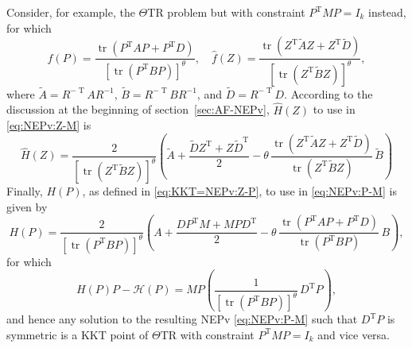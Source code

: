 \documentclass[11pt]{article}
\def\scrH{\mathscr{H}}
\def\wtd{\widetilde}
\def\what{\widehat}
\newcommand\STM[2]{{\rm St}(#1,#2)}
\DeclareMathOperator{\tr}{tr}
\DeclareMathOperator{\T}{T}
\theoremstyle{definition}
\numberwithin{equation}{section}
\begin{document}
Consider, for example, the $\Theta$TR problem but with  constraint $P^{\T}MP=I_k$ instead, for which
$$
f(P)=\frac {\tr(P^{\T}AP+P^{\T}D)}{[\tr(P^{\T}BP)]^{\theta}}, \quad
\hat f(Z)=\frac {\tr(Z^{\T}\wtd AZ+Z^{\T}\wtd D)}{[\tr(Z^{\T}\wtd BZ)]^{\theta}},
$$
where $\wtd A=R^{-\T}AR^{-1}$, $\wtd B=R^{-\T}BR^{-1}$, and $\wtd D=R^{-\T}D$. According to the discussion
at the beginning of section~\ref{sec:AF-NEPv}, $\what H(Z)$ to use in \eqref{eq:NEPv:Z-M} is
$$
\what H(Z)=\frac 2{[\tr(Z^{\T}\wtd BZ)]^{\theta}}
     \left(\wtd A+\frac {\wtd DZ^{\T}+Z\wtd D^{\T}}2
           -\theta\,\frac {\tr(Z^{\T}\wtd AZ+Z^{\T}\wtd D)}{\tr(Z^{\T}\wtd BZ)}\,\wtd B\right)
$$
Finally, $H(P)$, as defined in \eqref{eq:KKT=NEPv:Z-P},  to use in \eqref{eq:NEPv:P-M} is given by
$$
H(P)=\frac 2{[\tr(P^{\T}BP)]^{\theta}}
     \left(A+\frac {DP^{\T}M+MPD^{\T}}2-\theta\,\frac {\tr(P^{\T}AP+P^{\T}D)}{\tr(P^{\T}BP)}\,B\right),
$$
for which
$$
H(P)P-\scrH(P)=MP\left(\frac 1{[\tr(P^{\T}BP)]^{\theta}}\, {D^{\T}P}\right),
$$
and hence any solution to the resulting NEPv \eqref{eq:NEPv:P-M} such that $D^{\T}P$ is symmetric is a KKT
point of $\Theta$TR with  constraint $P^{\T}MP=I_k$ and vice versa.

\end{document}
